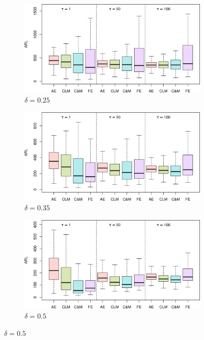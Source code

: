 \begin{figure}
\centering
\begin{subfigure}{0.49\textwidth}
  \centering
  \caption{$ \delta = 0.25$}
  \label{fig:lambda=0.20/theta=4.0/delta=0.25}
  \includegraphics[width=\textwidth]{img/sims/theta=4.0_signedEWMA(l = 0.2, upw = true, L = 1.0)/delta=0.25.png}
\end{subfigure}
\begin{subfigure}{0.49\textwidth}
  \centering
  \caption{$ \delta = 0.35$}
  \label{fig:lambda=0.20/theta=4.0/delta=0.35}
  \includegraphics[width=\textwidth]{img/sims/theta=4.0_signedEWMA(l = 0.2, upw = true, L = 1.0)/delta=0.35.png}
\end{subfigure}
\begin{subfigure}{0.49\textwidth}
  \centering
  \caption{$ \delta = 0.5$}
  \label{fig:lambda=0.20/theta=4.0/delta=0.5}
  \includegraphics[width=\textwidth]{img/sims/theta=4.0_signedEWMA(l = 0.2, upw = true, L = 1.0)/delta=0.50.png}

\end{subfigure}
\end{figure}
